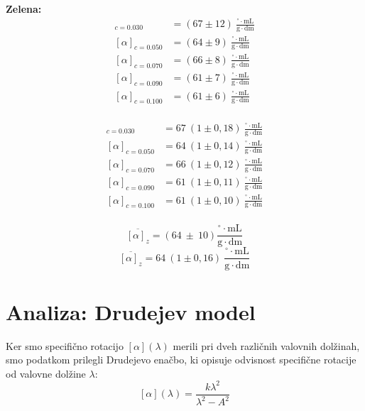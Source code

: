 \documentclass[9pt,a4paper,twocolumn,twoside]{tau-class/tau}
\begin{document}
\begin{minipage}{0.24\textwidth}
\textbf{Zelena:}
\begin{align*}
[\alpha]_{c=0.030} &= (67 \pm 12) \ \frac{^\circ \cdot \mathrm{mL}}{\mathrm{g} \cdot \mathrm{dm}}\\
[\alpha]_{c=0.050} &= (64 \pm 9) \ \frac{^\circ \cdot \mathrm{mL}}{\mathrm{g} \cdot \mathrm{dm}}\\
[\alpha]_{c=0.070} &= (66 \pm 8) \ \frac{^\circ \cdot \mathrm{mL}}{\mathrm{g} \cdot \mathrm{dm}}\\
[\alpha]_{c=0.090} &= (61 \pm 7) \ \frac{^\circ \cdot \mathrm{mL}}{\mathrm{g} \cdot \mathrm{dm}}\\
[\alpha]_{c=0.100} &= (61 \pm 6) \ \frac{^\circ \cdot \mathrm{mL}}{\mathrm{g} \cdot \mathrm{dm}}\\
\end{align*}
\end{minipage}
\hfill
\begin{minipage}{0.24\textwidth}
\begin{align*}
[\alpha]_{c=0.030} &= 67 \ (1 \pm 0{,}18) \ \frac{^\circ \cdot \mathrm{mL}}{\mathrm{g} \cdot \mathrm{dm}}\\
[\alpha]_{c=0.050} &= 64 \ (1 \pm 0{,}14) \ \frac{^\circ \cdot \mathrm{mL}}{\mathrm{g} \cdot \mathrm{dm}}\\
[\alpha]_{c=0.070} &= 66 \ (1 \pm 0{,}12) \ \frac{^\circ \cdot \mathrm{mL}}{\mathrm{g} \cdot \mathrm{dm}}\\
[\alpha]_{c=0.090} &= 61 \ (1 \pm 0{,}11) \ \frac{^\circ \cdot \mathrm{mL}}{\mathrm{g} \cdot \mathrm{dm}}\\
[\alpha]_{c=0.100} &= 61 \ (1 \pm 0{,}10) \ \frac{^\circ \cdot \mathrm{mL}}{\mathrm{g} \cdot \mathrm{dm}}\\
\end{align*}
\end{minipage}

\[
\overline{[\alpha]_{z}} = (64 \ \pm \ 10) \frac{^\circ \cdot \mathrm{mL}}{\mathrm{g} \cdot \mathrm{dm}}
\]
\[
\overline{[\alpha]_{z}} = 64 \ (1 \pm 0{,}16) \ \frac{^\circ \cdot \mathrm{mL}}{\mathrm{g} \cdot \mathrm{dm}}
\]
\pagebreak

\section{Analiza: Drudejev model}

Ker smo specifično rotacijo $[\alpha](\lambda)$ merili pri dveh različnih valovnih dolžinah, smo podatkom prilegli Drudejevo enačbo, ki opisuje odvisnost specifične rotacije od valovne dolžine $\lambda$:
\[
[\alpha](\lambda) = \frac{k \lambda^2}{\lambda^2 - A^2}
\]
\end{document}
